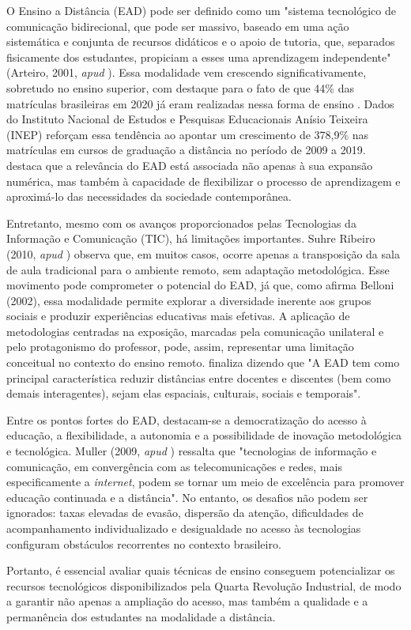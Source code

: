 O Ensino a Distância (EAD) pode ser definido como um "sistema tecnológico de comunicação bidirecional, que pode ser massivo, baseado em uma ação sistemática e conjunta de recursos didáticos e o apoio de tutoria, que, separados fisicamente dos estudantes, propiciam a esses uma aprendizagem independente" (Arteiro, 2001, \textit{apud} \cite{rochaMetodologiasAprendizagensNo2022}). Essa modalidade vem crescendo significativamente, sobretudo no ensino superior, com destaque para o fato de que 44\% das matrículas brasileiras em 2020 já eram realizadas nessa forma de ensino \cite{rochaMetodologiasAprendizagensNo2022}. Dados do Instituto Nacional de Estudos e Pesquisas Educacionais Anísio Teixeira (INEP) reforçam essa tendência ao apontar um crescimento de 378,9\% nas matrículas em cursos de graduação a distância no período de 2009 a 2019. \cite{moranEnsinoSuperiorDistancia2009} destaca que a relevância do EAD está associada não apenas à sua expansão numérica, mas também à capacidade de flexibilizar o processo de aprendizagem e aproximá-lo das necessidades da sociedade contemporânea.

Entretanto, mesmo com os avanços proporcionados pelas Tecnologias da Informação e Comunicação (TIC), há limitações importantes. Suhre Ribeiro (2010, \textit{apud} \cite{schneiderSalaAulaInvertida2013}) observa que, em muitos casos, ocorre apenas a transposição da sala de aula tradicional para o ambiente remoto, sem adaptação metodológica. Esse movimento pode comprometer o potencial do EAD, já que, como afirma Belloni (2002)\cite{belloniEnsaioSobreEducacao2002}, essa modalidade permite explorar a diversidade inerente aos grupos sociais e produzir experiências educativas mais efetivas. A aplicação de metodologias centradas na exposição, marcadas pela comunicação unilateral e pelo protagonismo do professor, pode, assim, representar uma limitação conceitual no contexto do ensino remoto. \cite{belloniEnsaioSobreEducacao2002} finaliza dizendo que "A EAD tem como principal característica reduzir distâncias entre docentes e discentes (bem como demais interagentes), sejam elas espaciais, culturais, sociais e temporais".

Entre os pontos fortes do EAD, destacam-se a democratização do acesso à educação, a flexibilidade, a autonomia e a possibilidade de inovação metodológica e tecnológica. Muller (2009, \textit{apud} \cite{vasconcelosEstrategiasEnsinoAplicaveis2013}) ressalta que "tecnologias de informação e comunicação, em convergência com as telecomunicações e redes, mais especificamente a \textit{internet}, podem se tornar um meio de excelência para promover educação continuada e a distância". No entanto, os desafios não podem ser ignorados: taxas elevadas de evasão, dispersão da atenção, dificuldades de acompanhamento individualizado e desigualdade no acesso às tecnologias configuram obstáculos recorrentes no contexto brasileiro.

Portanto, é essencial avaliar quais técnicas de ensino conseguem potencializar os recursos tecnológicos disponibilizados pela Quarta Revolução Industrial, de modo a garantir não apenas a ampliação do acesso, mas também a qualidade e a permanência dos estudantes na modalidade a distância.